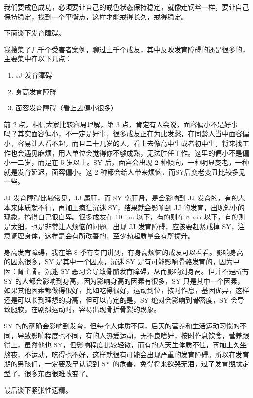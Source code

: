 \documentclass[fontset=founder]{ctexart}
\begin{document}
我们要戒色成功，必须要让自己的戒色状态保持稳定，就像走钢丝一样，要让自己保持稳定，找到一个平衡点，这样才能戒得长久，戒得稳定。

下面谈下发育障碍。

我搜集了几千个受害者案例，聊过上千个戒友，其中反映发育障碍的还是很多的，主要集中在以下几点：

\begin{enumerate}
    \item JJ 发育障碍
    \item 身高发育障碍
    \item 面容发育障碍（看上去偏小很多）
\end{enumerate}

前 2 点，相信大家比较容易理解，第 3 点，肯定有人会说，面容偏小不是好事吗？其实面容偏小，不一定是好事，很多戒友正在为此发愁，在同龄人当中面容偏小，容易让人看不起，而且二十几岁的人，看上去像高中生或者初中生，将来找工作也会遇见麻烦，用人单位会觉得你不够成熟，无法胜任工作。这里的偏小不是偏小一二岁，而是在 5 岁以上。SY 后，面容会出现 2 种倾向，一种明显变老，一种就是发育延迟，面容偏小。这 2 种都会给人带来烦恼，而SY后变老变丑比较多见一些。

JJ 发育障碍比较常见，JJ 属肝，而 SY 伤肝肾，是会影响到 JJ 发育的，有的人本来体质就不行，再加上疯狂沉迷 SY，结果就会影响到 JJ 的发育，出现短小的现象，搞得自己很自卑。很多戒友在 \SI{10}{\centi\metre} 以下，有的则在 \SI{8}{\centi\metre} 以下，有的则是太细，也是非常让人烦恼的问题。出现 JJ 发育障碍，应该要赶紧戒掉 SY，注意调理身体，这样是会有所改善的，至少勃起质量会有所提升。

身高发育障碍，我在第 8 季有专门讲到，有身高烦恼的戒友可以看看。影响身高的因素很多，SY 是其中一个因素，沉迷 SY 是有可能影响骨骼发育的，因为中医：肾主骨。沉迷 SY 恶习会导致骨骼发育障碍，从而影响到身高。但并不是所有 SY 的人都会影响到身高，因为影响身高的因素有很多，SY 只是其中一个因素，如果其他因素都做得很好，比如吃得很好，运动到位，按时作息，基因优异，这样还是可以长到理想的身高，但可以肯定的是，SY 绝对会影响到骨密度，SY 会导致腿软，在剧烈运动时，容易出现骨折骨裂的现象。

SY 的的确确会影响到发育，但每个人体质不同，后天的营养和生活运动习惯的不同，导致影响程度也不同，有的人热爱运动，无不良嗜好，按时作息饮食，营养跟得上，虽然他也 SY，但影响程度比较轻微，而有的人天生体质不佳，再加上久坐熬夜，不运动，吃得也不好，这样就很有可能会出现严重的发育障碍。所以在发育期的男孩们，一定要及早认识到 SY 的危害，免得将来欲哭无泪，过了发育期就定型了，很多东西很难改变了。

最后谈下紧张性遗精。
\end{document}
